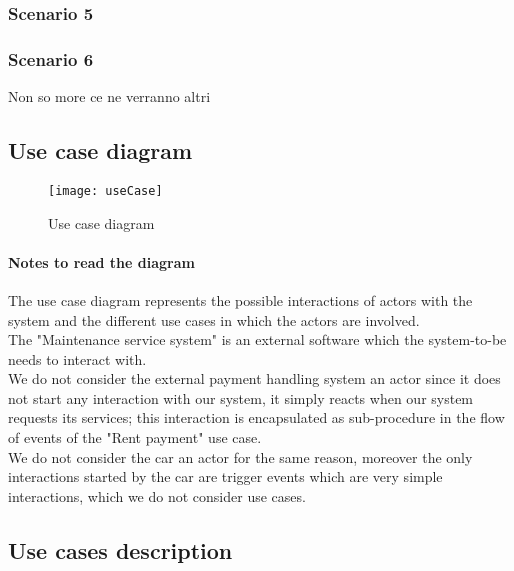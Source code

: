 \subsubsection{Scenario 5}
\label{scenario:5}
	
\subsubsection{Scenario 6}
\label{scenario:6}
	Non so more ce ne verranno altri

\clearpage
\subsection{Use case diagram}

\begin{figure}[h!]
	\centering
	\texttt{[image: useCase]}
	\caption{
		\label{fig:useCase} 
		Use case diagram
	}
\end{figure}
\clearpage
\paragraph{Notes to read the diagram}
The use case diagram represents the possible interactions of actors with the system and the different use cases in which the actors are involved.\\

The "Maintenance service system" is an external software which the system-to-be needs to interact with. \\
 
We do not consider the external payment handling system an actor since it does not start any interaction with our system, it simply reacts when our system requests its services; this interaction is encapsulated as sub-procedure in the flow of events of the "Rent payment" use case.\\

We do not consider the car an actor for the same reason, moreover the only interactions started by the car are trigger events which are very simple interactions, which we do not consider use cases.\\
\clearpage
\subsection{Use cases description}

